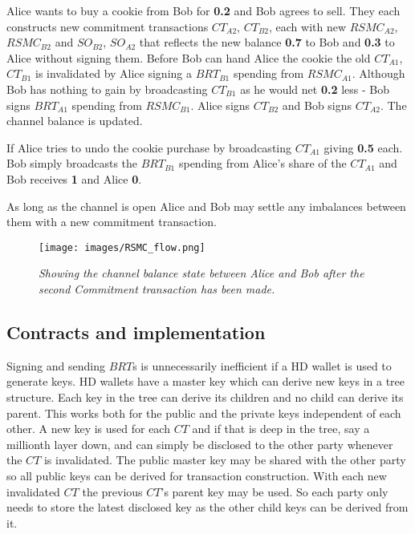 Alice wants to buy a cookie from Bob for \textbf{0.2\bitcoin} and Bob agrees to sell. They each constructs new commitment transactions $CT_{A2}$, $CT_{B2}$, each with new $RSMC_{A2}$, $RSMC_{B2}$ and $SO_{B2}$, $SO_{A2}$ that reflects the new balance \textbf{0.7\bitcoin} to Bob and \textbf{0.3\bitcoin} to Alice without signing them. Before Bob can hand Alice the cookie the old $CT_{A1}$, $CT_{B1}$ is invalidated by Alice signing a $BRT_{B1}$ spending from $RSMC_{A1}$. Although Bob has nothing to gain by broadcasting $CT_{B1}$ as he would net \textbf{0.2\bitcoin} less - Bob signs $BRT_{A1}$ spending from $RSMC_{B1}$. Alice signs $CT_{B2}$ and Bob signs $CT_{A2}$. The channel balance is updated.

If Alice tries to undo the cookie purchase by broadcasting $CT_{A1}$ giving \textbf{0.5\bitcoin} each. Bob simply broadcasts the $BRT_{B1}$ spending from Alice's share of the $CT_{A1}$ and Bob receives \textbf{1\bitcoin} and Alice \textbf{0\bitcoin}. 


As long as the channel is open Alice and Bob may settle any imbalances between them with a new commitment transaction. 

\begin{figure}[!htb]
		\hspace*{-1.2cm} 
	\centering
	\texttt{[image: images/RSMC\_flow.png]}
	\caption{\textit{Showing the channel balance state between Alice and Bob after the second Commitment transaction has been made. 
	}}
	\label{fig:rsmc_second_commitment}
		\hspace*{2mm} 
\end{figure}

\subsection{Contracts and implementation}
\label{sec:hdw}
Signing and sending $BRT$s is unnecessarily inefficient if a HD wallet is used to generate keys\cite{bip:0032:hd:wallet}. HD wallets have a master key which can derive new keys in a tree structure. Each key in the tree can derive its children and no child can derive its parent. This works both for the public and the private keys independent of each other. A new key is used for each $CT$ and if that is deep in the tree, say a millionth layer down, and can simply be disclosed to the other party whenever the $CT$ is invalidated. The public master key may be shared with the other party so all public keys can be derived for transaction construction. With each new invalidated $CT$ the previous $CT$'s parent key may be used. So each party only needs to store the latest disclosed key as the other child keys can be derived from it.

